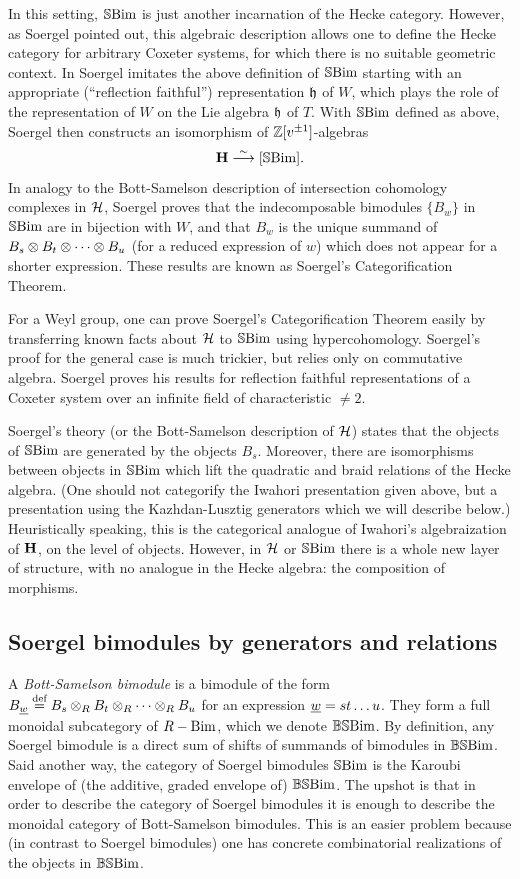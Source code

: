 In this setting, $\mathbb{S}\textrm{Bim}$ is just another incarnation of the Hecke category. However, as Soergel pointed out, this algebraic description allows one to define the Hecke category for arbitrary Coxeter systems, for which there is no suitable geometric context. In \cite{Soe3} Soergel imitates the above definition of $\mathbb{S}\textrm{Bim}$ starting with an appropriate (``reflection faithful'') representation ${\mathfrak h}$ of $W$, which plays the role of the representation of $W$ on the Lie algebra ${\mathfrak h}$ of $T$. With $\mathbb{S}\textrm{Bim}$ defined as above, Soergel then constructs an isomorphism of ${\mathbb{Z}}[v^{\pm 1}]$-algebras
\[
{\mathbf H} \stackrel{\sim}{\longrightarrow} [\mathbb{S}\textrm{Bim}].
\]
In analogy to the Bott-Samelson description of intersection cohomology complexes in ${\mathcal{H}}$, Soergel proves that the indecomposable bimodules $\{B_w\}$ in $\mathbb{S}\textrm{Bim}$ are in bijection with $W$, and that $B_w$ is the unique summand of $B_s \otimes B_t \otimes \cdots \otimes B_u$ (for a reduced expression of $w$) which does not appear for a shorter expression. These results are known as Soergel's Categorification Theorem.

For a Weyl group, one can prove Soergel's Categorification Theorem easily by transferring known facts about ${\mathcal{H}}$ to $\mathbb{S}\textrm{Bim}$ using hypercohomology. Soergel's proof for the general case is much trickier, but relies only on commutative algebra. Soergel proves his results for reflection faithful representations of a Coxeter system over an infinite field of characteristic $\ne 2$.

Soergel's theory (or the Bott-Samelson description of ${\mathcal{H}}$) states that the objects of $\mathbb{S}\textrm{Bim}$ are generated by the objects $B_s$. Moreover, there are isomorphisms between objects in $\mathbb{S}\textrm{Bim}$ which lift the quadratic and braid relations of the Hecke algebra. (One should not categorify the Iwahori presentation given above, but a presentation using the Kazhdan-Lusztig generators which we will describe below.)  Heuristically speaking, this is the categorical analogue of Iwahori's algebraization of ${\mathbf H}$, on the level of objects. However, in ${\mathcal{H}}$ or $\mathbb{S}\textrm{Bim}$ there is a whole new layer of structure, with no analogue in the Hecke algebra: the composition of morphisms.

\subsection{Soergel bimodules by generators and relations}

A \emph{Bott-Samelson bimodule} is a bimodule of the form $B_{\underline{w}} \stackrel{\mbox{\scriptsize{def}}}{=} B_s \otimes_R B_t \otimes_R \cdots \otimes_R B_u$ for an expression $\underline{w}=st\dots u$. They form a full
monoidal subcategory of $R-\mathrm{Bim}$, which we denote $\mathbb{BS}\textrm{Bim}$. By definition, any Soergel bimodule is a direct sum of shifts of summands of bimodules in $\mathbb{BS}\textrm{Bim}$. Said another way, the
category of Soergel bimodules $\mathbb{S}\textrm{Bim}$ is the Karoubi envelope of (the additive, graded envelope of) $\mathbb{BS}\textrm{Bim}$. The upshot is that in order to describe the category of Soergel bimodules it
is enough to describe the monoidal category of Bott-Samelson bimodules. This is an easier problem because (in contrast to Soergel bimodules) one has concrete combinatorial realizations of
the objects in $\mathbb{BS}\textrm{Bim}$.

